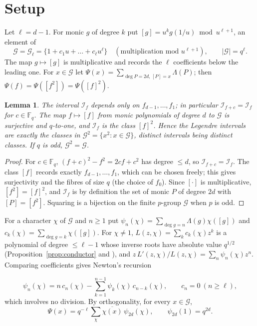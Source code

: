 \documentclass[11pt,a4paper]{article}
\newtheorem{lemma}[theorem]{Lemma}
\theoremstyle{definition}
\theoremstyle{remark}
\newcommand{\Fq}{\mathbb{F}_q}
\newcommand{\cI}{\mathcal{I}}
\newcommand{\cG}{\mathcal{G}}
\begin{document}
\section{Setup}\label{sec:setup}

Let $\ell=d-1$. For monic $g$ of degree $k$ put $[g]=u^kg(1/u)\bmod u^{\ell+1}$, an element of
\[
 \cG=\cG_\ell=\{1+c_1u+\dots+c_\ell u^\ell\}\quad(\text{multiplication mod }u^{\ell+1}),\qquad|\cG|=q^\ell .
\]
The map $g\mapsto[g]$ is multiplicative and records the $\ell$ coefficients below the leading one.
For $x\in\cG$ let $\Psi(x)=\sum_{\deg P=2d,\,[P]=x}\Lambda(P)$; then $\Psi(f)=\Psi([f^2])=\Psi([f]^2)$.

\begin{lemma}\label{lem:legendre-classes}
The interval $\cI_f$ depends only on $f_{d-1},\dots,f_1$; in particular $\cI_{f+c}=\cI_f$ for $c\in\Fq$.
The map $f\mapsto[f]$ from monic polynomials of degree $d$ to $\cG$ is surjective and $q$-to-one, and
$\cI_f$ is the class $[f]^2$. Hence the Legendre intervals are exactly the classes in
$\cG^2=\{x^2:x\in\cG\}$, distinct intervals being distinct classes. If $q$ is odd, $\cG^2=\cG$.
\end{lemma}

\begin{proof}
For $c\in\Fq$, $(f+c)^2-f^2=2cf+c^2$ has degree $\le d$, so $\cI_{f+c}=\cI_f$. The class $[f]$ records
exactly $f_{d-1},\dots,f_1$, which can be chosen freely; this gives surjectivity and the fibres of size $q$
(the choice of $f_0$). Since $[\cdot]$ is multiplicative, $[f^2]=[f]^2$, and $\cI_f$ is by definition the set of
monic $P$ of degree $2d$ with $[P]=[f^2]$. Squaring is a bijection on the finite $p$-group $\cG$ when $p$ is odd.
\end{proof}

\begin{sloppypar}
For a character $\chi$ of $\cG$ and $n\ge1$ put $\psi_n(\chi)=\sum_{\deg g=n}\Lambda(g)\chi([g])$ and
$c_k(\chi)=\sum_{\deg g=k}\chi([g])$. For $\chi\ne1$, $L(z,\chi)=\sum_kc_k(\chi)z^k$ is a polynomial of
degree $\le\ell-1$ whose inverse roots have absolute value $q^{1/2}$ (Proposition~\ref{prop:conductor}
and \cite{Hayes1965,KR2014}), and $z\,L'(z,\chi)/L(z,\chi)=\sum_n\psi_n(\chi)z^n$. Comparing
coefficients gives Newton's recursion
\end{sloppypar}
\begin{equation}\label{eq:newton}
 \psi_n(\chi)=n\,c_n(\chi)-\sum_{k=1}^{n-1}\psi_k(\chi)\,c_{n-k}(\chi),\qquad c_n=0\ (n\ge\ell),
\end{equation}
which involves no division. By orthogonality, for every $x\in\cG$,
\begin{equation}\label{eq:explicit}
 \Psi(x)=q^{-\ell}\sum_{\chi}\overline{\chi(x)}\,\psi_{2d}(\chi),\qquad \psi_{2d}(1)=q^{2d}.
\end{equation}
\end{document}
